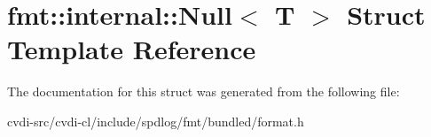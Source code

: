 \hypertarget{structfmt_1_1internal_1_1Null}{}\section{fmt\+:\+:internal\+:\+:Null$<$ T $>$ Struct Template Reference}
\label{structfmt_1_1internal_1_1Null}


The documentation for this struct was generated from the following file\+:\begin{DoxyCompactItemize}
\item 
cvdi-\/src/cvdi-\/cl/include/spdlog/fmt/bundled/format.\+h\end{DoxyCompactItemize}
